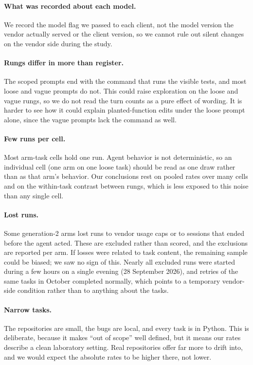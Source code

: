 \paragraph{What was recorded about each model.} We record the model flag we
passed to each client, not the model version the vendor actually served or
the client version, so we cannot rule out silent changes on the vendor side
during the study.

\paragraph{Rungs differ in more than register.} The scoped prompts end with
the command that runs the visible tests, and most loose and vague prompts do
not. This could raise exploration on the loose and vague rungs, so we do not
read the turn counts as a pure effect of wording. It is harder to see how it
could explain planted-function edits under the loose prompt alone, since the
vague prompts lack the command as well.

\paragraph{Few runs per cell.} Most arm-task cells hold one run. Agent
behavior is not deterministic, so an individual cell (one arm on one loose
task) should be read as one draw rather than as that arm's behavior. Our
conclusions rest on pooled rates over many cells and on the within-task
contrast between rungs, which is less exposed to this noise than any single
cell.

\paragraph{Lost runs.} Some generation-2 arms lost runs to vendor usage caps
or to sessions that ended before the agent acted. These are excluded rather
than scored, and the exclusions are reported per arm. If losses were related
to task content, the remaining sample could be biased; we saw no sign of
this. Nearly all excluded runs were started during a few hours on a single
evening (28 September 2026), and retries of the same tasks in October
completed normally, which points to a temporary vendor-side condition rather
than to anything about the tasks.

\paragraph{Narrow tasks.} The repositories are small, the bugs are local, and
every task is in Python. This is deliberate, because it makes ``out of scope''
well defined, but it means our rates describe a clean laboratory setting.
Real repositories offer far more to drift into, and we would expect the
absolute rates to be higher there, not lower.


